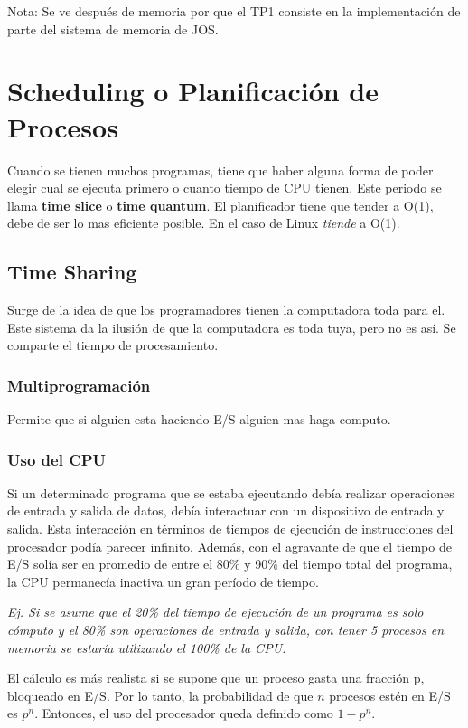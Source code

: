 \documentclass[titlepage,a4paper]{article}
\begin{document}
Nota: Se ve después de memoria por que el TP1 consiste en la implementación de parte del sistema de memoria de JOS.

\section{Scheduling o Planificación de Procesos}

Cuando se tienen muchos programas, tiene que haber alguna forma de poder elegir cual se ejecuta primero o cuanto tiempo de CPU tienen. Este periodo se llama \textbf{time slice} o \textbf{time quantum}. El planificador tiene que tender a O(1), debe de ser lo mas eficiente posible. En el caso de Linux \emph{tiende} a O(1).

\subsection*{Time Sharing}

Surge de la idea de que los programadores tienen la computadora toda para el. Este sistema da la ilusión de que la computadora es toda tuya, pero no es así. Se comparte el tiempo de procesamiento.

\subsubsection*{Multiprogramación}
Permite que si alguien esta haciendo E/S alguien mas haga computo.
\subsubsection*{Uso del CPU}
Si un determinado programa que se estaba ejecutando debía realizar operaciones de entrada y salida de datos, debía interactuar con un dispositivo de entrada y salida. Esta interacción en términos de tiempos de ejecución de instrucciones del procesador podía parecer infinito. Además, con el agravante de que el tiempo de E/S solía ser en promedio de entre el 80\% y 90\% del tiempo total del programa, la CPU permanecía inactiva un gran período de tiempo.

\textit{Ej. Si se asume que el 20\% del tiempo de ejecución de un programa es solo cómputo y el 80\% son operaciones de entrada y salida, con tener 5 procesos en memoria se estaría utilizando el 100\% de la CPU.}

El cálculo es más realista si se supone que un proceso gasta una fracción p, bloqueado en E/S. Por lo tanto, la probabilidad de que $n$ procesos estén en E/S es $p^n$. Entonces, el uso del procesador queda definido como $1-p^n$.
\end{document}
